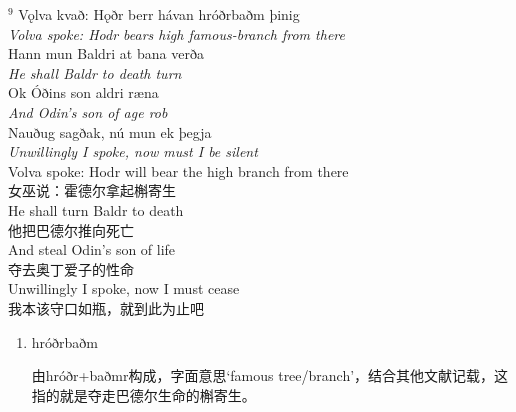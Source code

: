 \begin{paracol}{2}
    \noindent
    $^9$ Vǫlva kvað: Hǫðr berr hávan hróðrbaðm þinig\\
    \textit{Volva spoke: Hodr bears high famous-branch from there}\\
    Hann mun Baldri at bana verða\\
    \textit{He shall Baldr to death turn}\\
    Ok Óðins son aldri ræna\\
    \textit{And Odin's son of age rob}\\
    Nauðug sagðak, nú mun ek þegja\\
    \textit{Unwillingly I spoke, now must I be silent}\\
    \switchcolumn
    \noindent
    Volva spoke: Hodr will bear the high branch from there\\
    女巫说：霍德尔拿起槲寄生\\
    He shall turn Baldr to death\\
    他把巴德尔推向死亡\\
    And steal Odin's son of life\\
    夺去奥丁爱子的性命\\
    Unwillingly I spoke, now I must cease\\
    我本该守口如瓶，就到此为止吧
\end{paracol}
\begin{grammar*}{}
    \begin{enumerate}[leftmargin=*]
        \item hróðrbaðm

              由hróðr+baðmr构成，字面意思`famous tree/branch'，结合其他文献记载，这指的就是夺走巴德尔生命的槲寄生。
    \end{enumerate}
\end{grammar*}

